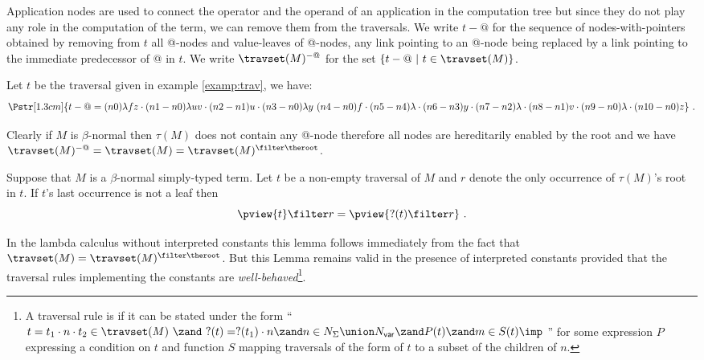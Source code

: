 Application nodes are used to connect the operator and the operand
of an application in the computation tree but since they do not play
any role in the computation of the term, we can remove them from the
traversals.  We write $t-@$ for the sequence of nodes-with-pointers
obtained by removing from $t$ all @-nodes and value-leaves of
@-nodes, any link pointing to an @-node being replaced by a link
pointing to the immediate predecessor of @ in $t$. We write
$\travset(M)^{-@}$ for the set $\{ t - @ \ | \  t \in \travset(M)
\}$.
\begin{example}
Let $t$ be the traversal given in example \ref{examp:trav}, we have:
  $$\Pstr[1.3cm]{ t - @ = (n0){\lambda f z}\cdot (n1-n0){\lambda u v}\cdot (n2-n1){u}\cdot (n3-n0){\lambda y}\ (n4-n0){f}\cdot (n5-n4){\lambda }\cdot (n6-n3){y}\cdot (n7-n2){\lambda }\cdot (n8-n1){v}\cdot (n9-n0){\lambda }\cdot (n10-n0){z}} \ .$$
\end{example}

\begin{remark}
Clearly if $M$ is $\beta$-normal then $\tau(M)$ does not contain any
@-node therefore all nodes are hereditarily enabled by the root and
we have $\travset(M)^{-@} = \travset(M) = \travset(M)^{\filter
\theroot }$.
\end{remark}



\begin{lemma}
\label{lem:betanf_trav_pview_red} Suppose that $M$ is a
$\beta$-normal simply-typed term. Let $t$ be a non-empty traversal
of $M$ and $r$ denote the only occurrence of $\tau(M)$'s root in
$t$. If $t$'s last occurrence is not a leaf then
$$ \pview{t} \filter r = \pview{?(t) \filter  r }\ .$$
\end{lemma}
In the lambda calculus without interpreted constants this lemma
follows immediately from the fact that $\travset(M) =
\travset(M)^{\filter \theroot}$. But this Lemma remains valid in the
presence of interpreted constants provided that the traversal rules
implementing the constants are \emph{well-behaved}\footnote{A
traversal rule is  if it can be stated under
the form ``$t = t_1\cdot n \cdot t_2 \in \travset(M)\ \zand\ ?(t) =
?(t_1) \cdot n \zand n \in N_{\Sigma}\union N_{\sf var} \zand P(t)
\zand m\in S(t) \imp\ $'' for some expression $P$ expressing
a condition on $t$ and function $S$ mapping traversals of the form
of $t$ to a subset of the children of $n$.}.

